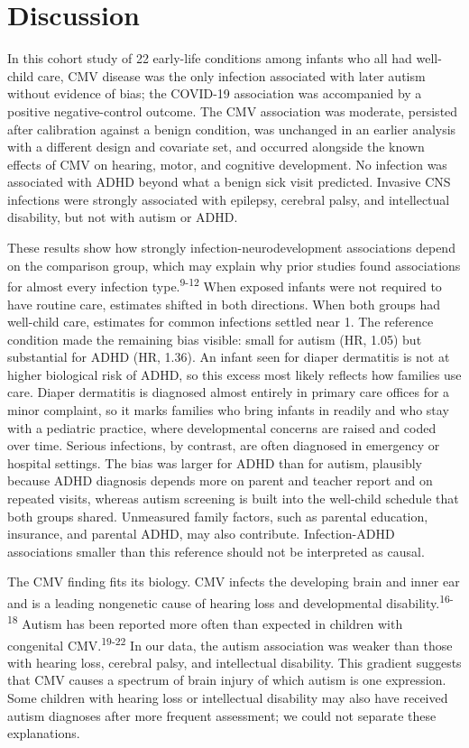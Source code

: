 \documentclass[11pt]{article}
\begin{document}
\hypertarget{discussion}{%
\section*{Discussion}\label{discussion}}

In this cohort study of 22 early-life conditions among infants who all had well-child care, CMV disease was the only infection associated with later autism without evidence of bias; the COVID-19
association was accompanied by a positive negative-control outcome. The CMV association was moderate, persisted after calibration against a benign condition, was unchanged in an earlier analysis with
a different design and covariate set, and occurred alongside the known effects of CMV on hearing, motor, and cognitive development. No infection was associated with ADHD beyond what a benign sick
visit predicted. Invasive CNS infections were strongly associated with epilepsy, cerebral palsy, and intellectual disability, but not with autism or ADHD.

These results show how strongly infection-neurodevelopment associations depend on the comparison group, which may explain why prior studies found associations for almost every infection
type.\textsuperscript{9-12} When exposed infants were not required to have routine care, estimates shifted in both directions. When both groups had well-child care, estimates for common infections
settled near 1. The reference condition made the remaining bias visible: small for autism (HR, 1.05) but substantial for ADHD (HR, 1.36). An infant seen for diaper dermatitis is not at higher
biological risk of ADHD, so this excess most likely reflects how families use care. Diaper dermatitis is diagnosed almost entirely in primary care offices for a minor complaint, so it marks families
who bring infants in readily and who stay with a pediatric practice, where developmental concerns are raised and coded over time. Serious infections, by contrast, are often diagnosed in emergency or
hospital settings. The bias was larger for ADHD than for autism, plausibly because ADHD diagnosis depends more on parent and teacher report and on repeated visits, whereas autism screening is built
into the well-child schedule that both groups shared. Unmeasured family factors, such as parental education, insurance, and parental ADHD, may also contribute. Infection-ADHD associations smaller than
this reference should not be interpreted as causal.

The CMV finding fits its biology. CMV infects the developing brain and inner ear and is a leading nongenetic cause of hearing loss and developmental disability.\textsuperscript{16-18} Autism has been
reported more often than expected in children with congenital CMV.\textsuperscript{19-22} In our data, the autism association was weaker than those with hearing loss, cerebral palsy, and intellectual
disability. This gradient suggests that CMV causes a spectrum of brain injury of which autism is one expression. Some children with hearing loss or intellectual disability may also have received
autism diagnoses after more frequent assessment; we could not separate these explanations.
\end{document}

